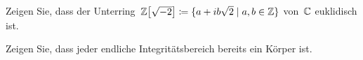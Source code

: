 \documentclass{scrartcl}
\begin{document}
\begin{exercise}
  Zeigen Sie, dass der Unterring~$\Integer\bigl[ \sqrt{-2} \bigr] \defined \{ a + i b \sqrt{2} \suchthat a, b \in \Integer \}$ von~$\mathbb{C}$ euklidisch ist.
\end{exercise}

\begin{exercise}
  Zeigen Sie, dass jeder endliche Integritätsbereich bereits ein Körper ist.
\end{exercise}


\end{document}
